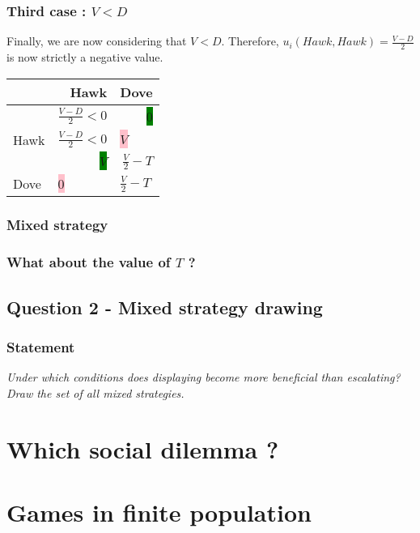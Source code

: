 \documentclass{article}
\begin{document}
\subsubsection{Third case : $V<D$}
Finally, we are now considering that $V<D$. Therefore, $u_{i}(Hawk, Hawk) = \frac{V-D}{2}$ is now strictly a negative value. 

\begin{center}
\begin{tabular}{|l|r|r|}
  \hline
  			   & Hawk & Dove \\
  \hline
  		   & \hspace{1cm} $\frac{V-D}{2}<0$ & \colorbox{green}{0} \\
  	Hawk &	\multicolumn{1}{|l|}{$\frac{V-D}{2}<0$}		& 	\multicolumn{1}{|l|}{\colorbox{pink}{$V$}}		\\
  \hline
    		   & \multicolumn{1}{|r|}{\colorbox{green}{$V$}} & \hspace{1cm} $\frac{V}{2}-T$  \\
  Dove &	\multicolumn{1}{|l|}{\colorbox{pink}{0}}		& 	\multicolumn{1}{|l|}{$\frac{V}{2}-T$}		\\
  \hline
\end{tabular}
\label{table:NE-case3}
\end{center}

\subsubsection{Mixed strategy}

\subsubsection{What about the value of $T$ ?}

\subsection{Question 2 - Mixed strategy drawing}

\subsubsection*{Statement}

\textit{Under which conditions does displaying become more beneficial than escalating? Draw the set of all mixed strategies.} 

\section{Which social dilemma ?}


\section{Games in finite population}
\end{document}
